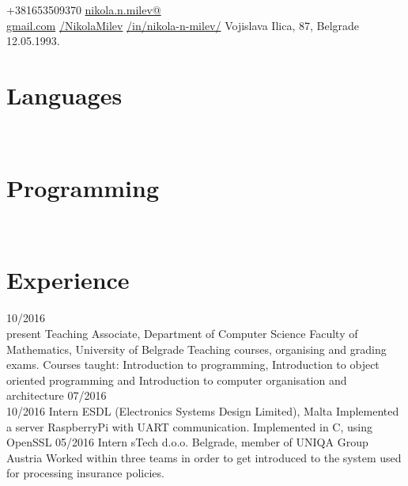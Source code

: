 \documentclass[a4paper]{my_cv}
\begin{document}
\thispagestyle{empty}	
	{+381653509370}
 	{\href{mailto:nikola.n.milev@gmail.com}{nikola.n.milev@\\gmail.com}}
	{ \href{https://github.com/NikolaMilev}{/NikolaMilev}} 	
 	{ \href{https://www.linkedin.com/in/nikola-n-milev/}{/in/nikola-n-milev/}}
	{ Vojislava Ilica, 87, Belgrade }
	{12.05.1993.}


 
\begin{aside}
\section{Languages}
\bodyfont{}
~
~
\section{Programming}
\end {aside}
~
~\\
\section{Experience}
\begin{entrylist}
\entry
    {10/2016~\textemdash \\present}
    {Teaching Associate, Department of Computer Science}
    {Faculty of Mathematics, University of Belgrade}
    {Teaching courses, organising and grading exams. Courses taught: Introduction to programming, Introduction to object oriented programming and Introduction to computer organisation and architecture}
\entry
    {07/2016~\textemdash \\10/2016}
    {Intern}
    {ESDL (Electronics Systems Design Limited), Malta}
    {Implemented a server RaspberryPi with UART communication. Implemented in C, using OpenSSL}
\entry
    {05/2016}
    {Intern}
    {sTech d.o.o. Belgrade, member of UNIQA Group Austria}
    {Worked within three teams in order to get introduced to the system used for processing insurance policies. }
\end{entrylist}
\end{document}

